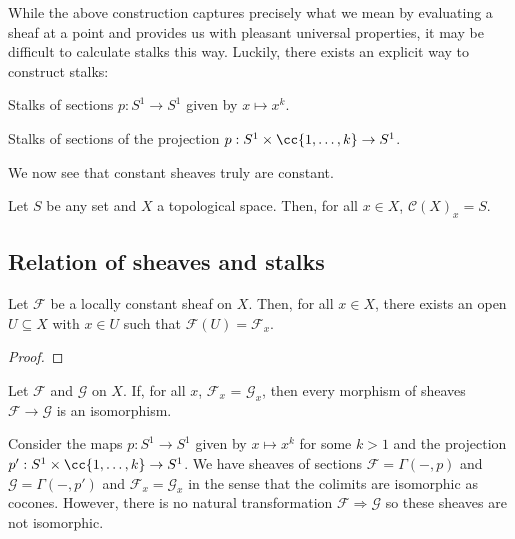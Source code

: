 \documentclass{article}
\begin{document}
While the above construction captures precisely what we mean by
evaluating a sheaf at a point and provides us with pleasant universal
properties, it may be difficult to calculate stalks this way. Luckily,
there exists an explicit way to construct stalks:

\begin{proposition}
\end{proposition}

\begin{example}
  Stalks of sections $p:S^1\to S^1$ given by $x\mapsto x^k$.
  \missingexample
\end{example}

\begin{example}
  Stalks of sections of the projection $p:S^1\times\cc{1,\ldots,k}\to S^1$.
  \missingexample
\end{example}

We now see that constant sheaves truly are constant.

\begin{example}
  Let $S$ be any set and $X$ a topological space. Then, for all
  $x\in X$, $\mathscr C(X)_x = S$.
\end{example}

\subsection{Relation of sheaves and stalks}

\begin{lemma}
  Let $\mathscr F$ be a locally constant sheaf on $X$. Then, for all $x\in X$,
  there exists an open $U\subseteq X$ with $x\in U$ such that $\mathscr
  F(U)=\mathscr F_x$.
  \begin{proof}
    \missingproof
  \end{proof}
\end{lemma}

\begin{theorem}
  Let $\mathscr F$ and $\mathscr G$ on $X$. If, for all $x$,
  $\mathscr F_x$ = $\mathscr G_x$, then every morphism of sheaves
  $\mathscr F\to\mathscr G$ is an isomorphism.
\end{theorem}

\begin{example}
  Consider the maps $p:S^1\to S^1$ given by $x\mapsto x^k$ for some $k>1$
  and the projection $p':S^1\times\cc{1,\ldots,k}\to S^1$. We have sheaves
  of sections $\mathscr F=\Gamma(-,p)$ and $\mathscr G=\Gamma(-,p')$
  and $\mathscr F_x=\mathscr G_x$ in the sense that the colimits are
  isomorphic as cocones. However, there is no natural transformation
  $\mathscr F\Rightarrow\mathscr G$ so these sheaves are not isomorphic.
\end{example}

\printbibliography{}
\end{document}
